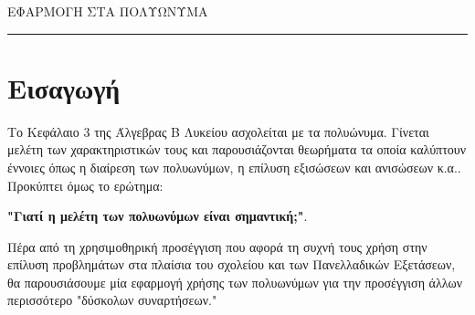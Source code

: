 \documentclass[11pt]{article}
\begin{document}
\begin{center}
\huge{ΕΦΑΡΜΟΓΗ ΣΤΑ ΠΟΛΥΩΝΥΜΑ}

\end{center}
\rule{\textwidth}{2pt}

\section*{Εισαγωγή}
Το Κεφάλαιο 3 της Άλγεβρας Β Λυκείου ασχολείται με τα πολυώνυμα. Γίνεται μελέτη των χαρακτηριστικών τους και παρουσιάζονται θεωρήματα τα οποία καλύπτουν έννοιες όπως η διαίρεση των πολυωνύμων, η επίλυση εξισώσεων και ανισώσεων κ.α.. Προκύπτει όμως το ερώτημα:
\begin{center}

	\textbf{"Γιατί η μελέτη των πολυωνύμων είναι σημαντική;"}.
\end{center}

Πέρα από τη χρησιμοθηρική προσέγγιση που αφορά τη συχνή τους χρήση στην επίλυση προβλημάτων στα πλαίσια του σχολείου και των Πανελλαδικών Εξετάσεων, θα παρουσιάσουμε μία εφαρμογή χρήσης των πολυωνύμων για την προσέγγιση άλλων περισσότερο "δύσκολων συναρτήσεων."
\setlength{\columnsep}{20pt}\setlength{\columnseprule}{0pt}
\end{document}
